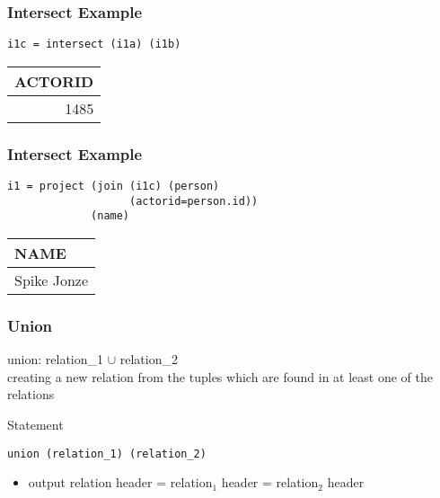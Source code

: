 \documentclass[dvipsnames]{beamer}
\theoremstyle{plain}
\begin{document}
\begin{frame}[fragile]
  \frametitle{Intersect Example}

  \begin{example}
    \begin{lstlisting}
i1c = intersect (i1a) (i1b)
    \end{lstlisting}

    \pause
    \begin{tiny}
    \begin{table}
      \begin{tabular}{|r|}\hline
ACTORID\\\hline\hline
   1485\\\hline
      \end{tabular}
    \end{table}
    \end{tiny}
  \end{example}
\end{frame}

\begin{frame}[fragile]
  \frametitle{Intersect Example}

  \begin{example}
    \begin{lstlisting}
i1 = project (join (i1c) (person)
                   (actorid=person.id))
             (name)
    \end{lstlisting}

    \pause
    \begin{tiny}
    \begin{table}
      \begin{tabular}{|l|}\hline
NAME       \\\hline\hline
Spike Jonze\\\hline
      \end{tabular}
    \end{table}
    \end{tiny}
  \end{example}
\end{frame}

\begin{frame}[fragile]
  \frametitle{Union}

  \begin{definition}
    \alert{union}: relation\_1 $\cup$ relation\_2\\
      creating a new relation from the tuples which are found in
      at least one of the relations
  \end{definition}

  \pause
  \begin{block}{Statement}
    \begin{lstlisting}
union (relation_1) (relation_2)
    \end{lstlisting}
  \end{block}

  \pause
  \begin{itemize}
    \item output relation header = relation$_1$ header = relation$_2$ header
  \end{itemize}
\end{frame}
\end{document}
